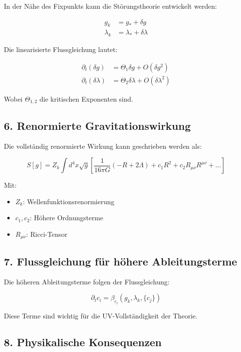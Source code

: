 \documentclass{article}
\begin{document}
In der Nähe des Fixpunkts kann die Störungstheorie entwickelt werden:

\begin{align*}
	g_k &= g_* + \delta g \\
	\lambda_k &= \lambda_* + \delta \lambda
\end{align*}

Die linearisierte Flussgleichung lautet:

\begin{align*}
	\partial_t (\delta g) &= \Theta_1 \delta g + O(\delta g^2) \\
	\partial_t (\delta \lambda) &= \Theta_2 \delta \lambda + O(\delta \lambda^2)
\end{align*}

Wobei $\Theta_{1,2}$ die kritischen Exponenten sind.

\subsection{6. Renormierte Gravitationswirkung}

Die vollständig renormierte Wirkung kann geschrieben werden als:

\[
S[g] = Z_k \int d^4x \sqrt{g} \left[\frac{1}{16\pi G} \left(-R + 2\Lambda\right) + c_1 R^2 + c_2 R_{\mu\nu} R^{\mu\nu} + \dots\right]
\]

Mit:

\begin{itemize}
	\item $Z_k$: Wellenfunktionsrenormierung
	\item $c_1,c_2$: Höhere Ordnungsterme
	\item $R_{\mu\nu}$: Ricci-Tensor
\end{itemize}

\subsection{7. Flussgleichung für höhere Ableitungsterme}

Die höheren Ableitungsterme folgen der Flussgleichung:

\[
\partial_t c_i = \beta_{c_i}(g_k,\lambda_k,\{c_j\})
\]

Diese Terme sind wichtig für die UV-Vollständigkeit der Theorie.

\subsection{8. Physikalische Konsequenzen}
\end{document}
